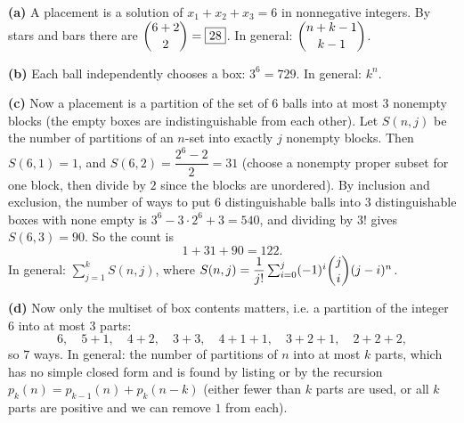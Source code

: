 \textbf{(a)} A placement is a solution of $x_1+x_2+x_3=6$ in nonnegative integers. By stars and bars there are $\dbinom{6+2}{2}=\boxed{28}$. In general: $\dbinom{n+k-1}{k-1}$.

\textbf{(b)} Each ball independently chooses a box: $3^6=\boxed{729}$. In general: $k^n$.

\textbf{(c)} Now a placement is a partition of the set of $6$ balls into at most $3$ nonempty blocks (the empty boxes are indistinguishable from each other). Let $S(n,j)$ be the number of partitions of an $n$-set into exactly $j$ nonempty blocks. Then $S(6,1)=1$, and $S(6,2)=\dfrac{2^6-2}{2}=31$ (choose a nonempty proper subset for one block, then divide by $2$ since the blocks are unordered). By inclusion and exclusion, the number of ways to put $6$ distinguishable balls into $3$ distinguishable boxes with none empty is $3^6-3\cdot2^6+3=540$, and dividing by $3!$ gives $S(6,3)=90$. So the count is
\[
1+31+90=\boxed{122}.
\]
In general: $\sum_{j=1}^{k}S(n,j)$, where $S(n,j)=\dfrac{1}{j!}\sum_{i=0}^{j}(-1)^i\dbinom ji(j-i)^n$.

\textbf{(d)} Now only the multiset of box contents matters, i.e. a partition of the integer $6$ into at most $3$ parts:
\[
6,\quad 5+1,\quad 4+2,\quad 3+3,\quad 4+1+1,\quad 3+2+1,\quad 2+2+2,
\]
so $\boxed{7}$ ways. In general: the number of partitions of $n$ into at most $k$ parts, which has no simple closed form and is found by listing or by the recursion $p_k(n)=p_{k-1}(n)+p_k(n-k)$ (either fewer than $k$ parts are used, or all $k$ parts are positive and we can remove $1$ from each).
